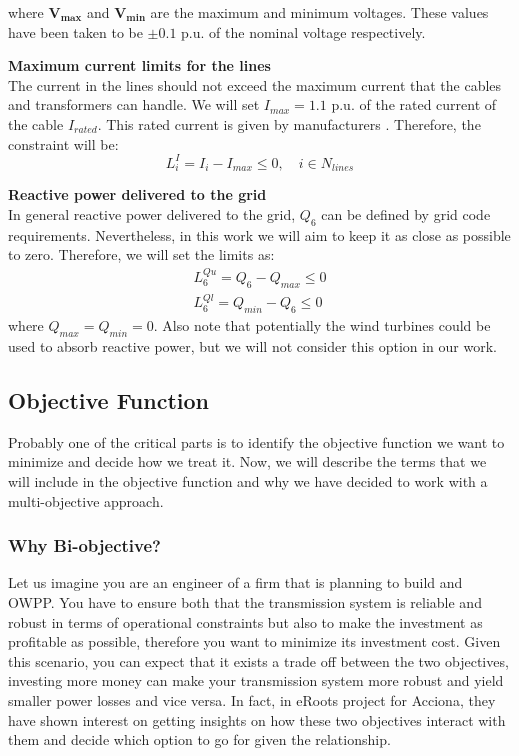 \documentclass[a4paper,11pt, titlepage, twoside]{article}
\begin{document}
where $\mathbf{V_{max}}$ and $\mathbf{V_{min}}$ are the maximum and minimum voltages. These values have been taken to be $\pm 0.1$ p.u. of the nominal voltage respectively.

\textbf{Maximum current limits for the lines}\\
The current in the lines should not exceed the maximum current that the cables and transformers can handle. We will set $I_{max} = 1.1$ p.u. of the rated current of the cable $I_{rated}$. This rated current is given by manufacturers \cite{ABB}.
Therefore, the constraint will be:
\begin{equation}
    L_{i}^{I} = I_i - I_{max} \leq 0, \quad i \in N_{lines}
\end{equation}

\textbf{Reactive power delivered to the grid}\\
In general reactive power delivered to the grid, $Q_6$ can be defined by grid code requirements. Nevertheless, in this work we will aim to keep it as close as
possible to zero. Therefore, we will set the limits as:
\begin{equation}
\begin{aligned}
    L_{6}^{Qu} = Q_6 - Q_{max} \leq 0 \\
    L_{6}^{Ql} = Q_{min} - Q_{6} \leq 0
\end{aligned}
\end{equation}
where $Q_{max}=Q_{min}=0$. Also note that potentially the wind turbines could be used to absorb reactive power, but we will not consider this option in our work.


\subsection{Objective Function}\label{objfun}

Probably one of the critical parts is to identify the objective function we want to minimize and decide how we treat it. Now, we will describe the terms that we will include in the objective function
and why we have decided to work with a multi-objective approach.\par

\subsubsection{Why Bi-objective?} \label{biobjective}

Let us imagine you are an engineer of a firm that is planning to build and OWPP. You have to ensure both that the transmission system is reliable and robust in terms of operational constraints but also to make the
investment as profitable as possible, therefore you want to minimize its investment cost. Given this scenario, you can expect that it exists a trade off between the two objectives, investing more money can make your transmission system more robust and yield smaller power losses and
vice versa. In fact, in eRoots project for Acciona, they have shown interest on getting insights on how these two objectives interact with them and decide which option to go for given the relationship.\par
\end{document}

